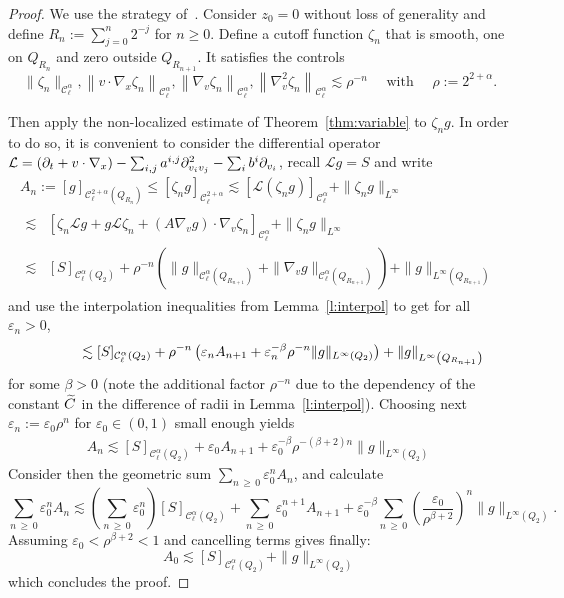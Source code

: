 \documentclass[10pt]{amsart}
\theoremstyle{definition}\newtheorem{defi}[theo]{Definition}\newtheorem{rema}[theo]{Remark}\newtheorem{exam}[theo]{Example}\newtheorem{exem}[theo]{Example}\newtheorem{nota}[theo]{Notation}
\newcommand{\cC}{\mathcal{C}}
\newcommand{\cL}{\mathcal{L}}
\newcommand*\eps{\varepsilon}
\let\oldtilde\tilde
\renewcommand*{\tilde}[1]{\mathchoice{\widetilde{#1}}{\widetilde{#1}}{\oldtilde{#1}}{\oldtilde{#1}}}
\begin{document}
\begin{proof}
We use the strategy of~\cite[Theorem~8.11.1]{krylov1996}. Consider $z_0=0$ without loss of generality and define $R_n := \sum_{j =0}^n 2^{-j}$ for $n \ge 0$. Define a cutoff function $\zeta_n$ that is smooth, one on $Q_{R_n}$ and zero outside $Q_{R_{n+1}}$. It satisfies the controls
\[
\| \zeta_n \|_{\cC_\ell^{\alpha}}, \left\| v \cdot \nabla_x \zeta_n
\right\|_{\cC_\ell^{\alpha}}, \left\| \nabla_v \zeta_n \right\|_{\cC_\ell^{\alpha}}, \left\|
\nabla_v ^2 \zeta_n \right\|_{\cC_\ell^{\alpha}} \lesssim \rho^{-n} \quad
\text{ with } \quad \rho :=2^{2+\alpha}.
\]


Then apply the non-localized estimate of Theorem~\ref{thm:variable} to $\zeta_n g$. In order to do so, it is convenient to consider the differential operator $\cL = (\partial_t + v \cdot \nabla_x) - \sum_{i,j} a^{i,j}
\partial^2_{v_i v_j}\linebreak- \sum_i b^i \partial_{v_i}$, recall $\cL g =S$ and write
\begin{multline*}
A_n := [g]_{\cC_\ell^{2+\alpha}\left(Q_{R_n}\right)} \le [\zeta_n g]_{\cC_\ell^{2+\alpha}}
\lesssim [\cL (\zeta_n g)]_{\cC_\ell^{\alpha}} + \| \zeta_n g \|_{L^\infty} \\
\begin{aligned}
\lesssim & \left[\zeta_n \cL g + g \cL \zeta_n + \left(A \nabla_v g\right) \cdot \nabla_v \zeta_n
\right]_{\cC_\ell^{\alpha}} + \| \zeta_n g \|_{L^\infty} \\
\lesssim & [S]_{\cC_\ell^{\alpha}(Q_2)} + \rho^{-n}
\left(\| g\|_{\cC_\ell^{\alpha}\left(Q_{R_{n+1}}\right)} + \| \nabla_v g\|_{\cC_\ell^{\alpha}\left(Q_{R_{n+1}}\right)}\right) +\|g\|_{L^\infty\left(Q_{R_{n+1}}\right)}
\end{aligned}
\end{multline*}
and use the interpolation inequalities from Lemma~\ref{l:interpol} to get for all $\eps_n >0$,
\[
\mkern60mu\lesssim [S]_{\cC_\ell^{\alpha}(Q_2)} + \rho^{-n} \left(\eps_n A_{n+1} + \eps_n^{-\beta} \rho^{-n} \|g\|_{L^\infty(Q_2)}\right) + \|g\|_{L^\infty\left(Q_{R_{n+1}}\right)}
\]
for some $\beta >0$ (note the additional factor $\rho^{-n}$ due to the dependency of the constant $\tilde{C}$ in the difference of radii in Lemma~\ref{l:interpol}). Choosing next $\eps_n := \eps_0 \rho^n$ for $\eps_0 \in (0,1)$ small enough yields
\begin{align*}
A_n \lesssim [S]_{\cC_\ell^{\alpha}(Q_2)} + \eps_0 A_{n+1} + \eps_0 ^{-\beta} \rho^{-(\beta+2) n} \| g \|_{L^\infty(Q_2)}
\end{align*}
Consider then the geometric sum $\sum_{n\,\ge \,0} \eps_0 ^n A_n$, and calculate
\[
\sum_{n\,\ge\,0} \eps_0^n A_n \lesssim \left(\sum_{n\,\ge\, 0}
\eps_0^n \right) [S]_{\cC_\ell^{\alpha}(Q_{2})} + \sum_{n\, \ge\,0}
\eps_0^{n+1} A_{n+1} + \eps_0 ^{-\beta}
\sum_{n\,\ge\,0} \left(
\frac{\eps_0}{\rho^{\beta+2}} \right) ^n
\| g \|_{L^\infty(Q_2)}.
\]
Assuming $\eps_0 < \rho^{\beta+2}<1$ and cancelling terms gives finally:
\[
A_0 \lesssim [S]_{\cC_\ell^{\alpha}(Q_{2})} + \| g \|_{L^\infty(Q_2)}
\]
which concludes the proof.
\end{proof}
\end{document}
